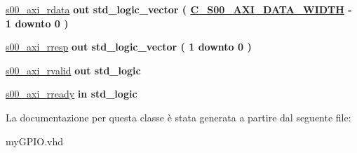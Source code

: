 \begin{DoxyCompactItemize}
\item 
\hypertarget{classmy_g_p_i_o_gad2655fadb987e0487c428aca187b55d0}{\hyperlink{group___a_x_i-device_gad2655fadb987e0487c428aca187b55d0}{s00\+\_\+axi\+\_\+rdata}  {\bfseries {\bfseries \textcolor{vhdlchar}{out}\textcolor{vhdlchar}{ }}} {\bfseries \textcolor{vhdlchar}{std\+\_\+logic\+\_\+vector}\textcolor{vhdlchar}{ }\textcolor{vhdlchar}{(}\textcolor{vhdlchar}{ }\textcolor{vhdlchar}{ }\textcolor{vhdlchar}{ }\textcolor{vhdlchar}{ }{\bfseries \hyperlink{group___a_x_i-device_gafce7943994a4ddfa81f224225976a4c7}{C\+\_\+\+S00\+\_\+\+A\+X\+I\+\_\+\+D\+A\+T\+A\+\_\+\+W\+I\+D\+T\+H}} \textcolor{vhdlchar}{-\/}\textcolor{vhdlchar}{ } \textcolor{vhdldigit}{1} \textcolor{vhdlchar}{ }\textcolor{vhdlchar}{downto}\textcolor{vhdlchar}{ }\textcolor{vhdlchar}{ } \textcolor{vhdldigit}{0} \textcolor{vhdlchar}{ }\textcolor{vhdlchar}{)}\textcolor{vhdlchar}{ }} }\label{classmy_g_p_i_o_gad2655fadb987e0487c428aca187b55d0}

\item 
\hypertarget{classmy_g_p_i_o_ga1acee955f50f71e5595a03c6ca301cf0}{\hyperlink{group___a_x_i-device_ga1acee955f50f71e5595a03c6ca301cf0}{s00\+\_\+axi\+\_\+rresp}  {\bfseries {\bfseries \textcolor{vhdlchar}{out}\textcolor{vhdlchar}{ }}} {\bfseries \textcolor{vhdlchar}{std\+\_\+logic\+\_\+vector}\textcolor{vhdlchar}{ }\textcolor{vhdlchar}{(}\textcolor{vhdlchar}{ }\textcolor{vhdlchar}{ } \textcolor{vhdldigit}{1} \textcolor{vhdlchar}{ }\textcolor{vhdlchar}{downto}\textcolor{vhdlchar}{ }\textcolor{vhdlchar}{ } \textcolor{vhdldigit}{0} \textcolor{vhdlchar}{ }\textcolor{vhdlchar}{)}\textcolor{vhdlchar}{ }} }\label{classmy_g_p_i_o_ga1acee955f50f71e5595a03c6ca301cf0}

\item 
\hypertarget{classmy_g_p_i_o_gaf180911f7eb262e530e26865bc97aa0b}{\hyperlink{group___a_x_i-device_gaf180911f7eb262e530e26865bc97aa0b}{s00\+\_\+axi\+\_\+rvalid}  {\bfseries {\bfseries \textcolor{vhdlchar}{out}\textcolor{vhdlchar}{ }}} {\bfseries \textcolor{vhdlchar}{std\+\_\+logic}\textcolor{vhdlchar}{ }} }\label{classmy_g_p_i_o_gaf180911f7eb262e530e26865bc97aa0b}

\item 
\hypertarget{classmy_g_p_i_o_ga8b82eb165d7024f6c7b25646f6ebdd4d}{\hyperlink{group___a_x_i-device_ga8b82eb165d7024f6c7b25646f6ebdd4d}{s00\+\_\+axi\+\_\+rready}  {\bfseries {\bfseries \textcolor{vhdlchar}{in}\textcolor{vhdlchar}{ }}} {\bfseries \textcolor{vhdlchar}{std\+\_\+logic}\textcolor{vhdlchar}{ }} }\label{classmy_g_p_i_o_ga8b82eb165d7024f6c7b25646f6ebdd4d}

\begin{DoxyCompactList}\small\item\em \end{DoxyCompactList}\end{DoxyCompactItemize}


La documentazione per questa classe è stata generata a partire dal seguente file\+:\begin{DoxyCompactItemize}
\item 
my\+G\+P\+I\+O.\+vhd\end{DoxyCompactItemize}
